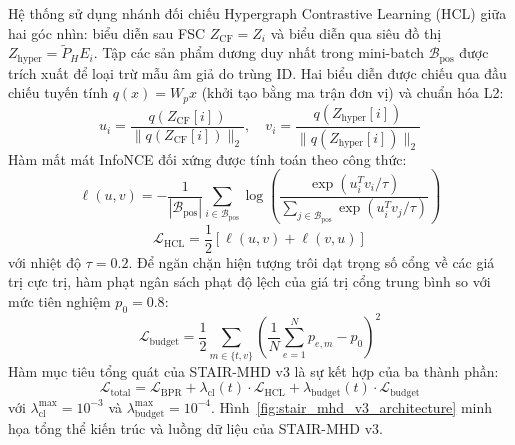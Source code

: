 Hệ thống sử dụng nhánh đối chiếu Hypergraph Contrastive Learning (HCL) giữa hai góc nhìn: biểu diễn sau FSC $Z_{\text{CF}} = Z_i$ và biểu diễn qua siêu đồ thị $Z_{\text{hyper}} = \tilde{P}_H E_i$. Tập các sản phẩm dương duy nhất trong mini-batch $\mathcal{B}_{\text{pos}}$ được trích xuất để loại trừ mẫu âm giả do trùng ID. Hai biểu diễn được chiếu qua đầu chiếu tuyến tính $q(x) = W_p x$ (khởi tạo bằng ma trận đơn vị) và chuẩn hóa L2:
\begin{equation}
u_i = \frac{q(Z_{\text{CF}}[i])}{\|q(Z_{\text{CF}}[i])\|_2}, \quad v_i = \frac{q(Z_{\text{hyper}}[i])}{\|q(Z_{\text{hyper}}[i])\|_2}
\end{equation}
Hàm mất mát InfoNCE đối xứng được tính toán theo công thức:
\begin{equation}
\ell(u, v) = -\frac{1}{|\mathcal{B}_{\text{pos}}|} \sum_{i \in \mathcal{B}_{\text{pos}}} \log \left( \frac{\exp(u_i^T v_i / \tau)}{\sum_{j \in \mathcal{B}_{\text{pos}}} \exp(u_i^T v_j / \tau)} \right)
\end{equation}
\begin{equation}
\mathcal{L}_{\text{HCL}} = \frac{1}{2}\left[\ell(u, v) + \ell(v, u)\right]
\end{equation}
với nhiệt độ $\tau = 0.2$. Để ngăn chặn hiện tượng trôi dạt trọng số cổng về các giá trị cực trị, hàm phạt ngân sách phạt độ lệch của giá trị cổng trung bình so với mức tiên nghiệm $p_0 = 0.8$:
\begin{equation}
\mathcal{L}_{\text{budget}} = \frac{1}{2} \sum_{m \in \{t, v\}} \left( \frac{1}{N} \sum_{e=1}^{N} p_{e, m} - p_0 \right)^2
\end{equation}
Hàm mục tiêu tổng quát của STAIR-MHD v3 là sự kết hợp của ba thành phần:
\begin{equation}
\mathcal{L}_{\text{total}} = \mathcal{L}_{\text{BPR}} + \lambda_{\text{cl}}(t) \cdot \mathcal{L}_{\text{HCL}} + \lambda_{\text{budget}}(t) \cdot \mathcal{L}_{\text{budget}}
\end{equation}
với $\lambda_{\text{cl}}^{\max} = 10^{-3}$ và $\lambda_{\text{budget}}^{\max} = 10^{-4}$. Hình~\ref{fig:stair_mhd_v3_architecture} minh họa tổng thể kiến trúc và luồng dữ liệu của STAIR-MHD v3.

